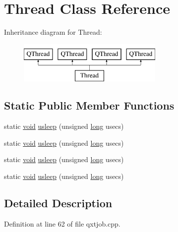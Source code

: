 \hypertarget{class_thread}{\section{Thread Class Reference}
\label{class_thread}
}
Inheritance diagram for Thread\-:\begin{figure}[H]
\begin{center}
\leavevmode
\includegraphics[height=2.000000cm]{class_thread}
\end{center}
\end{figure}
\subsection*{Static Public Member Functions}
\begin{DoxyCompactItemize}
\item 
static \hyperlink{group___u_a_v_objects_plugin_ga444cf2ff3f0ecbe028adce838d373f5c}{void} \hyperlink{class_thread_a44676f1488d962652d36aa7dacfec50e}{usleep} (unsigned \hyperlink{ioapi_8h_a3c7b35ad9dab18b8310343c201f7b27e}{long} usecs)
\item 
static \hyperlink{group___u_a_v_objects_plugin_ga444cf2ff3f0ecbe028adce838d373f5c}{void} \hyperlink{class_thread_a44676f1488d962652d36aa7dacfec50e}{usleep} (unsigned \hyperlink{ioapi_8h_a3c7b35ad9dab18b8310343c201f7b27e}{long} usecs)
\item 
static \hyperlink{group___u_a_v_objects_plugin_ga444cf2ff3f0ecbe028adce838d373f5c}{void} \hyperlink{class_thread_a44676f1488d962652d36aa7dacfec50e}{usleep} (unsigned \hyperlink{ioapi_8h_a3c7b35ad9dab18b8310343c201f7b27e}{long} usecs)
\item 
static \hyperlink{group___u_a_v_objects_plugin_ga444cf2ff3f0ecbe028adce838d373f5c}{void} \hyperlink{class_thread_a44676f1488d962652d36aa7dacfec50e}{usleep} (unsigned \hyperlink{ioapi_8h_a3c7b35ad9dab18b8310343c201f7b27e}{long} usecs)
\end{DoxyCompactItemize}


\subsection{Detailed Description}


Definition at line 62 of file qxtjob.\-cpp.



